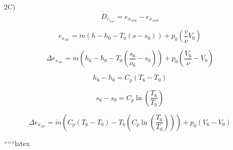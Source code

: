 2C)
\[
\dot{D}_{e_{x_{str}}} = e_{x_{str6}} - e_{x_{str0}}
\]

\[
\dot{e}_{x_{str}} = \dot{m} (h - h_0 - T_0 (s - s_0)) + p_0 \left( \frac{v}{\nu} V_0 \right)
\]

\[
\Delta e_{x_{str}} = \dot{m} (h_6 - h_0 - T_0 (\frac{s_6}{\nu_6} - s_0)) + p_0 \left( \frac{V_6}{\nu} - V_0 \right)
\]

\[
h_6 - h_0 = C_p (T_6 - T_0)
\]

\[
s_6 - s_0 = C_p \ln \left( \frac{T_6}{T_0} \right)
\]

\[
\Delta e_{x_{str}} = \dot{m} \left( C_p (T_6 - T_0) - T_6 \left( C_p \ln \left( \frac{T_6}{T_0} \right) \right) \right) + p_0 (V_6 - V_0)
\]

``````latex


